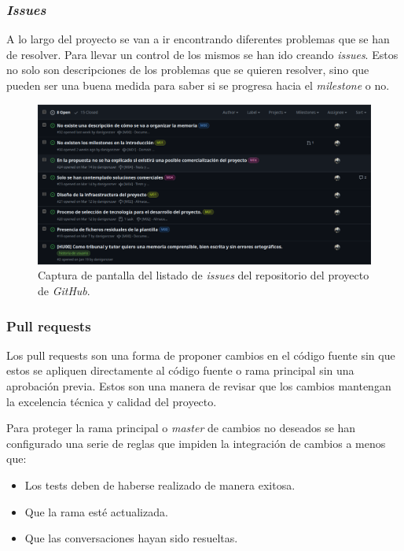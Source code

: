 \subsubsection{\textit{Issues}}

A lo largo del proyecto se van a ir encontrando diferentes problemas que se han de resolver. Para llevar un control de los mismos se han ido creando \textit{issues}. Estos no solo son descripciones de los problemas que se quieren resolver, sino que pueden ser una buena medida para saber si se progresa hacia el \textit{milestone} o no.

\begin{figure}[H]
    \caption{Captura de pantalla del listado de \textit{issues} del repositorio del proyecto de \textit{GitHub}.}
    \centering
    \vspace*{0.5cm}
    \includegraphics[scale=0.2]{figuras/github_issues.png}
\end{figure}

\subsubsection{Pull requests}

Los pull requests son una forma de proponer cambios en el código fuente sin que estos se apliquen directamente al código fuente o rama principal sin una aprobación previa. Estos son una manera de revisar que los cambios mantengan la excelencia técnica y calidad del proyecto.

Para proteger la rama principal o \textit{master} de cambios no deseados se han configurado una serie de reglas que impiden la integración de cambios a menos que:

\begin{itemize}
    \item Los tests deben de haberse realizado de manera exitosa.
    \item Que la rama esté actualizada.
    \item Que las conversaciones hayan sido resueltas.
\end{itemize}

